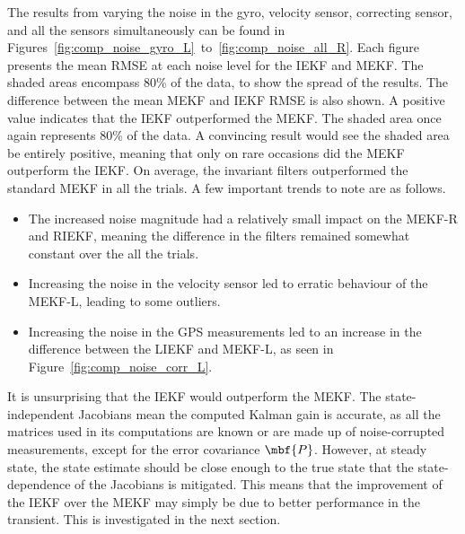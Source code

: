 The results from varying the noise in the gyro, velocity sensor, correcting sensor, and all the sensors simultaneously can be found in Figures~\ref{fig:comp_noise_gyro_L}~to~\ref{fig:comp_noise_all_R}. 
Each figure presents the mean RMSE at each noise level for the IEKF and MEKF. The shaded areas encompass 80\% of the data, to show the spread of the results. The difference between the mean MEKF and IEKF RMSE is also shown. A positive value indicates that the IEKF outperformed the MEKF. The shaded area once again represents 80\% of the data. A convincing result would see the shaded area be entirely positive, meaning that only on rare occasions did the MEKF outperform the IEKF. 
On average, the invariant filters outperformed the standard MEKF in all the trials. A few important trends to note are as follows.
\begin{itemize}
	\item The increased noise magnitude had a relatively small impact on the MEKF-R and RIEKF, meaning the difference in the filters remained somewhat constant over the all the trials.
	\item Increasing the noise in the velocity sensor led to erratic behaviour of the MEKF-L, leading to some outliers.
	\item Increasing the noise in the GPS measurements led to an increase in the difference between the LIEKF and MEKF-L, as seen in Figure~\ref{fig:comp_noise_corr_L}.
\end{itemize}
It is unsurprising that the IEKF would outperform the MEKF. The state-independent Jacobians mean the computed Kalman gain is accurate, as all the matrices used in its computations are known or are made up of noise-corrupted measurements, except for the error covariance $\mbf{P}$. However, at steady state, the state estimate should be close enough to the true state that the state-dependence of the Jacobians is mitigated. This means that the improvement of the IEKF over the MEKF may simply be due to better performance in the transient. This is investigated in the next section.

%

